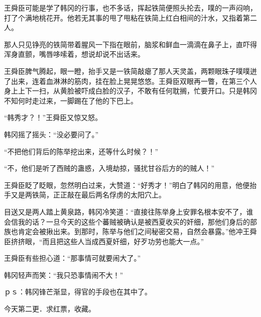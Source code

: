 王舜臣可能是学了韩冈的行事，也不多话，挥起铁简便照头抡去，噗的一声闷响，打了个满地桃花开。他若无其事的甩了甩粘在铁简上红白相间的汁水，又指着第二人。

那人只见铮亮的铁简带着腥风一下指在眼前，脑浆和鲜血一滴滴在鼻子上，直吓得浑身直颤，嘴唇哆嗦着，想说却说不出话来。

王舜臣脾气腾起，眼一瞪，抬手又是一铁简敲瘪了那人天灵盖，两颗眼珠子噗噗迸了出来，连着血淋淋的筋肉，挂在脸上晃晃悠悠。王舜臣双眼再一瞥，在第三个人身上上下一扫，从黄脸被吓成白脸的汉子，不敢有任何耽搁，忙要开口。只是韩冈不知何时走过来，一脚踢在了他的下巴上。

“韩秀才？！”王舜臣又惊又怒。

韩冈摇了摇头：“没必要问了。”

“不把他们背后的陈举挖出来，还等什么时候？！”

“不，他们是听了西贼的蛊惑，入境劫掠，骚扰甘谷后方的的贼人！”

王舜臣眨了眨眼，忽然明白过来，大赞道：“好秀才！”明白了韩冈的用意，他便抬手又是两铁简，正正敲在最后两名俘虏的太阳穴上。

目送又是两人踏上黄泉路，韩冈冷笑道：“直接往陈举身上安罪名根本安不了，谁会信我的话？一旦今天的这些个蕃贼被确认是被西夏收买的奸细，那他们身后的部族也肯定会被揪出来。到那时，陈举与他们之间秘密交易，自然会暴露。”他冲王舜臣挤挤眼，“而且把这些人当成西夏奸细，好歹功劳也能大一点。”

王舜臣有些担心道：“那事情可就要闹大了。”

韩冈轻声而笑：“我只恐事情闹不大！”

ｐｓ：韩冈锋芒渐显，得官的手段也在其中了。

今天第二更．求红票，收藏。

